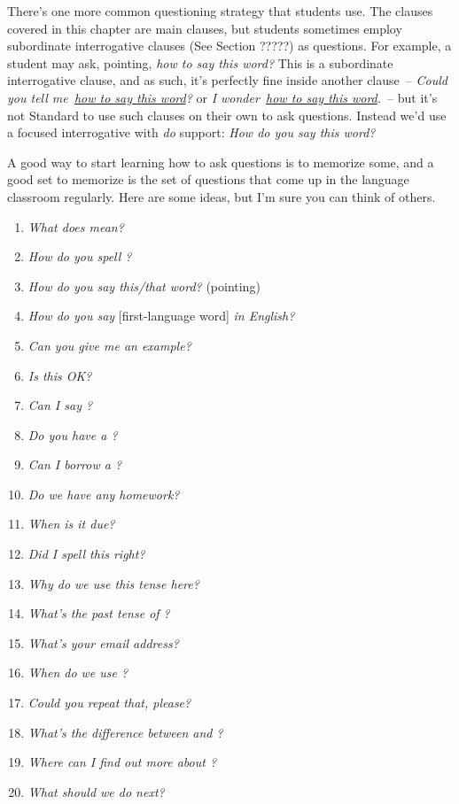  There's one more common questioning strategy that students use. The clauses covered in this chapter are main clauses, but students sometimes employ subordinate interrogative clauses (See Section  ?????) as questions. For example, a student may ask, pointing, \textit{how to say this word?} This is a subordinate interrogative clause, and as such, it's perfectly fine inside another clause~-- \textit{Could you tell me~\uline{how to say this word}?} or \textit{I wonder~\uline{how to say this word}.}~-- but it's not Standard to use such clauses on their own to ask questions. Instead we'd use a focused interrogative with \textit{do} support: \textit{How do you say this word?}

\begin{tcolorbox}[title=Classroom Questions, colback=white, parbox]
\setlength{\parindent}{1.5em}
    \noindent A good way to start learning how to ask questions is to memorize some, and a good set to memorize is the set of questions that come up in the language classroom regularly. Here are some ideas, but I'm sure you can think of others.

 \begin{enumerate}[noitemsep]
    \item \textit{What does \uline{\phantom{MMM}} mean?}
    \item \textit{How do you spell \uline{\phantom{MMM}}?}
    \item \textit{How do you say this/that word?} (pointing)
    \item \textit{How do you say }[first-language word]\textit{ in English?}
    \item \textit{Can you give me an example?}
    \item \textit{Is this OK?}
    \item \textit{Can I say \uline{\phantom{MMM}}?}
    \item \textit{Do you have a \uline{\phantom{MMM}}?}
    \item \textit{Can I borrow a \uline{\phantom{MMM}}?}
    \item \textit{Do we have any homework?}
    \item \textit{When is it due?}
    \item \textit{Did I spell this right?}
    \item \textit{Why do we use this tense here?}
    \item \textit{What's the past tense of \uline{\phantom{MMM}}?}
    \item \textit{What's your email address?}
    \item \textit{When do we use \uline{\phantom{MMM}}?}
    \item \textit{Could you repeat that, please?}
    \item \textit{What's the difference between \uline{\phantom{MMM}} and \uline{\phantom{MMM}}?}
    \item \textit{Where can I find out more about \uline{\phantom{MMM}}?}
    \item \textit{What should we do next?}
\end{enumerate}
\end{tcolorbox}

